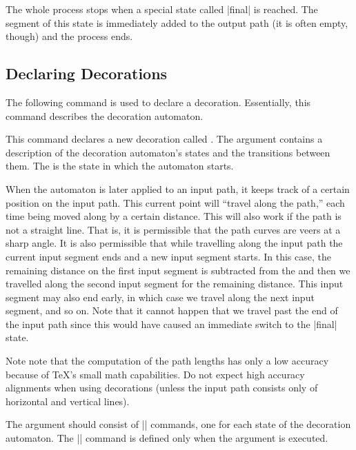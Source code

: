 The whole process stops when a special state called |final| is
reached. The segment of this state is immediately added to the output
path (it is often empty, though) and the process ends.




\subsection{Declaring Decorations}

The following command is used to declare a decoration. Essentially,
this command describes the decoration automaton.


\begin{command}{\pgfdeclaredecoration{}}
  This command declares a new decoration called . The
   argument contains a description of the decoration
  automaton's states and the transitions between them. The
   is the state in which the automaton starts.

  When the automaton is later applied to an input path, it keeps track
  of a certain position on the input path. This current point
  will ``travel along the path,'' each time being moved along by a
  certain distance. This will also work if the path is not a straight
  line. That is, it is permissible that the path curves are veers at a
  sharp angle.  It is also permissible that while travelling along the
  input path the current input segment ends and a new input segment starts. In this
  case, the remaining distance on the first input segment is subtracted
  from the  and then we travelled along the second
  input segment for the remaining distance. This input segment may also end
  early, in which case we travel along the next input segment, and so
  on. Note that it cannot happen that we travel past the end of the
  input path since this would have caused an immediate switch to
  the |final| state.

  Note note that the computation of the path lengths has only a low
  accuracy because of \TeX's small math capabilities. Do not
  expect high accuracy alignments when using decorations (unless the
  input path consists only of horizontal and vertical lines).

  The  argument should consist of |\state| commands, one
  for each state of the decoration automaton. The |\state| command is
  defined only when the  argument is executed.


\end{command}
